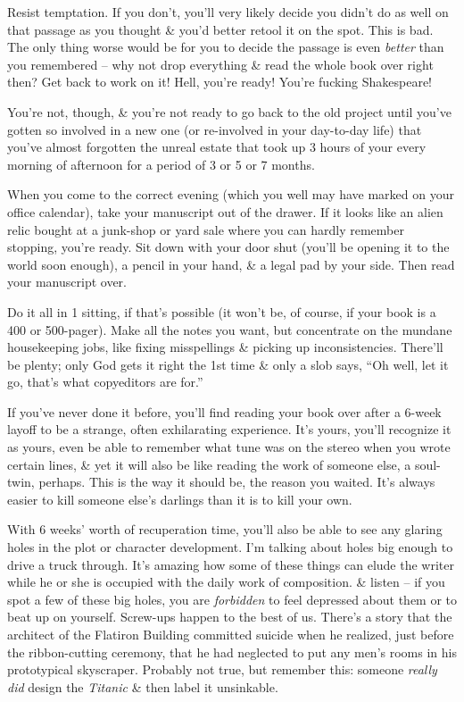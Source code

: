 \documentclass{article}
\numberwithin{equation}{section}
\begin{document}
Resist temptation. If you don't, you'll very likely decide you didn't do as well on that passage as you thought \& you'd better retool it on the spot. This is bad. The only thing worse would be for you to decide the passage is even \textit{better} than you remembered -- why not drop everything \& read the whole book over right then? Get back to work on it! Hell, you're ready! You're fucking Shakespeare!

You're not, though, \& you're not ready to go back to the old project until you've gotten so involved in a new one (or re-involved in your day-to-day life) that you've almost forgotten the unreal estate that took up 3 hours of your every morning of afternoon for a period of 3 or 5 or 7 months.

When you come to the correct evening (which you well may have marked on your office calendar), take your manuscript out of the drawer. If it looks like an alien relic bought at a junk-shop or yard sale where you can hardly remember stopping, you're ready. Sit down with your door shut (you'll be opening it to the world soon enough), a pencil in your hand, \& a legal pad by your side. Then read your manuscript over.

Do it all in 1 sitting, if that's possible (it won't be, of course, if your book is a 400 or 500-pager). Make all the notes you want, but concentrate on the mundane housekeeping jobs, like fixing misspellings \& picking up inconsistencies. There'll be plenty; only God gets it right the 1st time \& only a slob says, ``Oh well, let it go, that's what copyeditors are for.''

If you've never done it before, you'll find reading your book over after a 6-week layoff to be a strange, often exhilarating experience. It's yours, you'll recognize it as yours, even be able to remember what tune was on the stereo when you wrote certain lines, \& yet it will also be like reading the work of someone else, a soul-twin, perhaps. This is the way it should be, the reason you waited. It's always easier to kill someone else's darlings than it is to kill your own.

With 6 weeks' worth of recuperation time, you'll also be able to see any glaring holes in the plot or character development. I'm talking about holes big enough to drive a truck through. It's amazing how some of these things can elude the writer while he or she is occupied with the daily work of composition. \& listen -- if you spot a few of these big holes, you are \textit{forbidden} to feel depressed about them or to beat up on yourself. Screw-ups happen to the best of us. There's a story that the architect of the Flatiron Building committed suicide when he realized, just before the ribbon-cutting ceremony, that he had neglected to put any men's rooms in his prototypical skyscraper. Probably not true, but remember this: someone \textit{really did} design the \textit{Titanic} \& then label it unsinkable.
\end{document}
